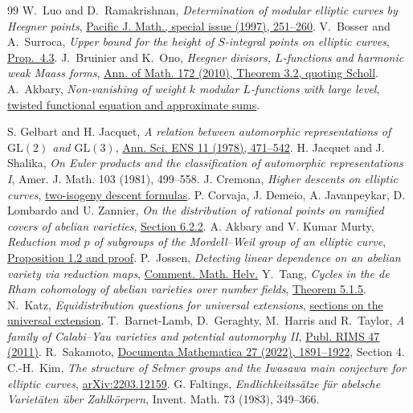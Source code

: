 \documentclass[11pt]{article}
\begin{document}
\begin{thebibliography}{99}
 W.~Luo and D.~Ramakrishnan, \emph{Determination of modular elliptic curves by Heegner points}, \href{https://msp.org/pjm/1997/181-3/pjm-v181-n3-p13-s.pdf}{Pacific J. Math., special issue (1997), 251--260}.
 V.~Bosser and A.~Surroca, \emph{Upper bound for the height of $S$-integral points on elliptic curves}, \href{https://arxiv.org/abs/1208.2693}{Prop.~4.3}.
 J.~Bruinier and K.~Ono, \emph{Heegner divisors, $L$-functions and harmonic weak Maass forms}, \href{https://annals.math.princeton.edu/wp-content/uploads/annals-v172-n3-p15-p.pdf}{Ann. of Math. 172 (2010), Theorem 3.2, quoting Scholl}.
 A.~Akbary, \emph{Non-vanishing of weight $k$ modular $L$-functions with large level}, \href{https://www.cs.uleth.ca/~akbary/paper1.pdf}{twisted functional equation and approximate sums}.

 S. Gelbart and H. Jacquet, \emph{A relation between automorphic representations of $\mathrm{GL}(2)$ and $\mathrm{GL}(3)$}, \href{https://doi.org/10.24033/asens.1355}{Ann. Sci. ENS 11 (1978), 471--542}.
 H. Jacquet and J. Shalika, \emph{On Euler products and the classification of automorphic representations I}, Amer. J. Math. 103 (1981), 499--558.
 J. Cremona, \emph{Higher descents on elliptic curves}, \href{https://johncremona.github.io/papers/d2.pdf}{two-isogeny descent formulas}.
 P. Corvaja, J. Demeio, A. Javanpeykar, D. Lombardo and U. Zannier, \emph{On the distribution of rational points on ramified covers of abelian varieties}, \href{https://www.cambridge.org/core/journals/compositio-mathematica/article/on-the-distribution-of-rational-points-on-ramified-covers-of-abelian-varieties/775198D2DDCD37DC7E16DF3406EA70CB}{Section 6.2.2}.
 A. Akbary and V. Kumar Murty, \emph{Reduction mod $p$ of subgroups of the Mordell--Weil group of an elliptic curve}, \href{https://www.cs.uleth.ca/~akbary/npr.pdf}{Proposition 1.2 and proof}.
 P.~Jossen, \emph{Detecting linear dependence on an abelian variety via reduction maps}, \href{https://ems.press/journals/cmh/articles/11958}{Comment. Math. Helv.}
 Y.~Tang, \emph{Cycles in the de Rham cohomology of abelian varieties over number fields}, \href{https://arxiv.org/abs/1510.01357}{Theorem 5.1.5}.
 N.~Katz, \emph{Equidistribution questions for universal extensions}, \href{https://web.math.princeton.edu/~nmk/univextn.pdf}{sections on the universal extension}.
 T.~Barnet-Lamb, D.~Geraghty, M.~Harris and R.~Taylor, \emph{A family of Calabi--Yau varieties and potential automorphy II}, \href{https://doi.org/10.2977/PRIMS/31}{Publ. RIMS 47 (2011)}.
 R.~Sakamoto, \href{https://ems.press/content/serial-article-files/29299}{Documenta Mathematica 27 (2022), 1891--1922}, Section 4.
 C.-H.~Kim, \emph{The structure of Selmer groups and the Iwasawa main conjecture for elliptic curves}, \href{https://arxiv.org/abs/2203.12159}{arXiv:2203.12159}.
 G. Faltings, \emph{Endlichkeitss\"atze f\"ur abelsche Variet\"aten \"uber Zahlk\"orpern}, Invent. Math. 73 (1983), 349--366.
\end{thebibliography}
\end{document}
